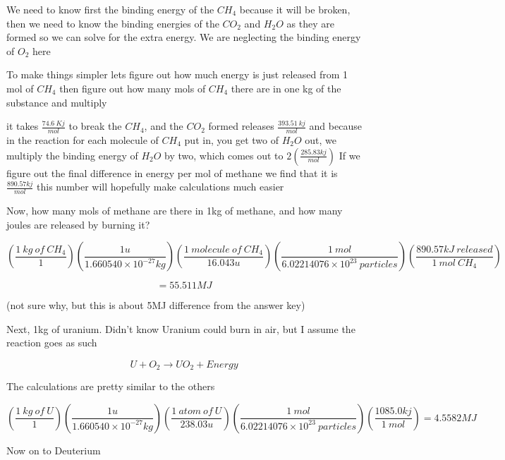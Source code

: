 \documentclass{article}
\begin{document}
We need to know first the binding energy of the $CH_4$ because it will be broken, then we need to know the binding energies of the $CO_2$ and $H_2O$ as they are formed so we can solve for the extra energy. We are neglecting the binding energy of $O_2$ here\vspace{10pt}

To make things simpler lets figure out how much energy is just released from 1 mol of $CH_4$ then figure out how many mols of $CH_4$ there are in one kg of the substance and multiply

it takes $\frac{74.6 \ Kj}{mol}$ to break the $CH_4$, and the $CO_2$ formed releases $\frac{393.51 \ kj}{mol}$ and because in the reaction for each molecule of $CH_4$ put in, you get two of $H_2O$ out, we multiply the binding energy of $H_2O$ by two, which comes out to $2(\frac{285.83kj}{mol})$ If we figure out the final difference in energy per mol of methane we find that it is $\frac{890.57kj}{mol}$ this number will hopefully make calculations much easier\vspace{10pt}

Now, how many mols of methane are there in 1kg of methane, and how many joules are released by burning it?\vspace{10pt}

$$\left(\frac{1 \ kg \ of \ CH_4}{1}\right)\left(\frac{1u}{1.660540\times10^{-27}kg}\right)\left(\frac{1 \ molecule \ of \ CH_4}{16.043u}\right)\left(\frac{1 \ mol}{6.02214076\times10^{23}\ particles}\right)\left(\frac{890.57kJ \ released}{1 \ mol \ CH_4}\right)$$\vspace{10pt}

$$=55.511MJ$$\vspace{10pt}

(not sure why, but this is about 5MJ difference from the answer key)\vspace{10pt}

Next, 1kg of uranium. Didn't know Uranium could burn in air, but I assume the reaction goes as such

$$U + O_2 \xrightarrow{} UO_2 + Energy$$\vspace{10pt}

\begin{center}
    The calculations are pretty similar to the others
\end{center}\vspace{10pt}

$$\left(\frac{1\ kg \ of \ U}{1}\right)\left(\frac{1u}{1.660540\times10^{-27}kg}\right)\left(\frac{1 \ atom \ of \ U}{238.03u}\right)\left(\frac{1 \ mol}{6.02214076\times10^{23}\ particles}\right)\left(\frac{1085.0kj}{1 \ mol}\right)= 4.5582 MJ$$\vspace{10pt}
\begin{center}
    Now on to Deuterium\vspace{10pt}
\end{center}
\end{document}
